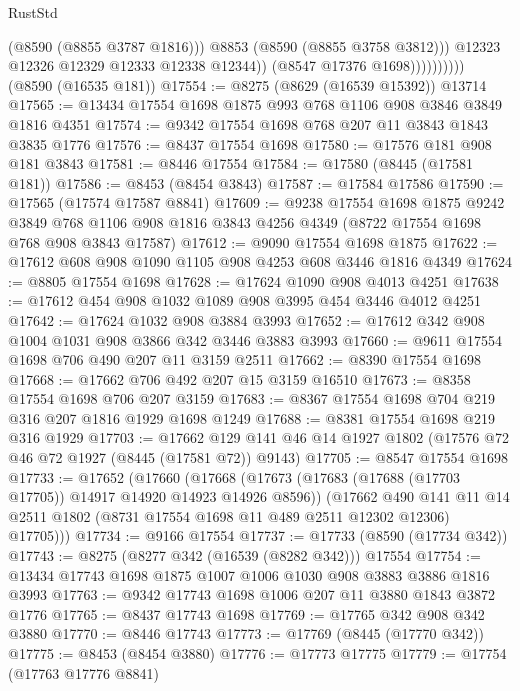 \begin{lexlean}{RustStd}
\begin{coremodule}
                              (@8590 (@8855 @3787 @1816)))
                            @8853
                            (@8590 (@8855 @3758 @3812)))
                          @12323
                          @12326
                          @12329
                          @12333
                          @12338
                          @12344))
                      (@8547 @17376 @1698))))))))))
    (@8590 (@16535 @181))
@17554 := @8275 (@8629 (@16539 @15392)) @13714
@17565 := @13434 @17554 @1698 @1875 @993 @768 @1106 @908 @3846 @3849 @1816 @4351
@17574 := @9342 @17554 @1698 @768 @207 @11 @3843 @1843 @3835 @1776
@17576 := @8437 @17554 @1698
@17580 := @17576 @181 @908 @181 @3843
@17581 := @8446 @17554
@17584 := @17580 (@8445 (@17581 @181))
@17586 := @8453 (@8454 @3843)
@17587 := @17584 @17586
@17590 := @17565 (@17574 @17587 @8841)
@17609 := @9238
    @17554
    @1698
    @1875
    @9242
    @3849
    @768
    @1106
    @908
    @1816
    @3843
    @4256
    @4349
    (@8722 @17554 @1698 @768 @908 @3843 @17587)
@17612 := @9090 @17554 @1698 @1875
@17622 := @17612 @608 @908 @1090 @1105 @908 @4253 @608 @3446 @1816 @4349
@17624 := @8805 @17554 @1698
@17628 := @17624 @1090 @908 @4013 @4251
@17638 := @17612 @454 @908 @1032 @1089 @908 @3995 @454 @3446 @4012 @4251
@17642 := @17624 @1032 @908 @3884 @3993
@17652 := @17612 @342 @908 @1004 @1031 @908 @3866 @342 @3446 @3883 @3993
@17660 := @9611 @17554 @1698 @706 @490 @207 @11 @3159 @2511
@17662 := @8390 @17554 @1698
@17668 := @17662 @706 @492 @207 @15 @3159 @16510
@17673 := @8358 @17554 @1698 @706 @207 @3159
@17683 := @8367 @17554 @1698 @704 @219 @316 @207 @1816 @1929 @1698 @1249
@17688 := @8381 @17554 @1698 @219 @316 @1929
@17703 := @17662 @129 @141 @46 @14 @1927 @1802 (@17576 @72 @46 @72 @1927 (@8445 (@17581 @72)) @9143)
@17705 := @8547 @17554 @1698
@17733 := @17652
    (@17660
      (@17668
        (@17673 (@17683 (@17688 (@17703 @17705)) @14917 @14920 @14923 @14926 @8596))
        (@17662
          @490
          @141
          @11
          @14
          @2511
          @1802
          (@8731 @17554 @1698 @11 @489 @2511 @12302 @12306)
          @17705)))
@17734 := @9166 @17554
@17737 := @17733 (@8590 (@17734 @342))
@17743 := @8275 (@8277 @342 (@16539 (@8282 @342))) @17554
@17754 := @13434 @17743 @1698 @1875 @1007 @1006 @1030 @908 @3883 @3886 @1816 @3993
@17763 := @9342 @17743 @1698 @1006 @207 @11 @3880 @1843 @3872 @1776
@17765 := @8437 @17743 @1698
@17769 := @17765 @342 @908 @342 @3880
@17770 := @8446 @17743
@17773 := @17769 (@8445 (@17770 @342))
@17775 := @8453 (@8454 @3880)
@17776 := @17773 @17775
@17779 := @17754 (@17763 @17776 @8841)

\end{coremodule}
\end{lexlean}
